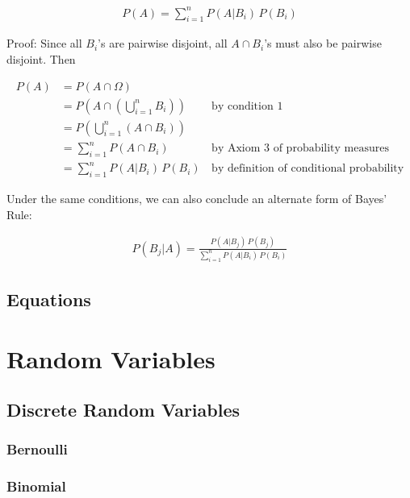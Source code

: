 \documentclass[a4paper,10pt]{article}
\begin{document}
\begin{align*}
    P(A) = \sum_{i=1}^n P(A|B_i)\,P(B_i)
\end{align*}

Proof: Since all $B_i$'s are pairwise disjoint, all $A\cap B_i$'s must also be pairwise disjoint. Then 

\begin{align*}
    P(A) &= P(A\cap \Omega) \\
         &= P\left(A\cap \left(\bigcup_{i=1}^n B_i\right)\right)\,&\text{by condition 1}\\
         &= P\left(\bigcup_{i=1}^n \left(A\cap B_i\right)\right) \\
         &= \sum_{i=1}^n P(A\cap B_i)\,&\text{by Axiom 3 of probability measures}\\
         &= \sum_{i=1}^n P(A|B_i)\,P(B_i)\,&\text{by definition of conditional probability}
\end{align*}

Under the same conditions, we can also conclude an alternate form of Bayes' Rule:

\begin{align*}
    P(B_j|A) = \frac{P(A|B_j)\,P(B_j)}{\sum_{i=1}^n P(A|B_i)\,P(B_i)}
\end{align*}

\subsection{Equations}



\newpage
\section{Random Variables}

\subsection{Discrete Random Variables}

\subsubsection{Bernoulli}

\subsubsection{Binomial}
\end{document}
